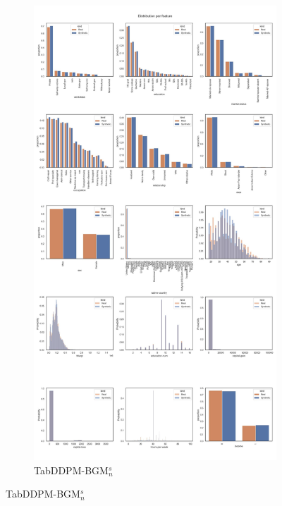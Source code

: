 \newpage
\begin{landscape}
	\begin{figure}[h]
		\centering
		\hfill
		\begin{subfigure}{0.3\linewidth}
			\includegraphics[height=\textheight,width=\linewidth,keepaspectratio]{images/distributions_full/tab-ddpm-bgm-simTune-none.jpg}
			\caption{TabDDPM-BGM$^{s}_n$}

\end{subfigure}
\end{figure}
\end{landscape}
